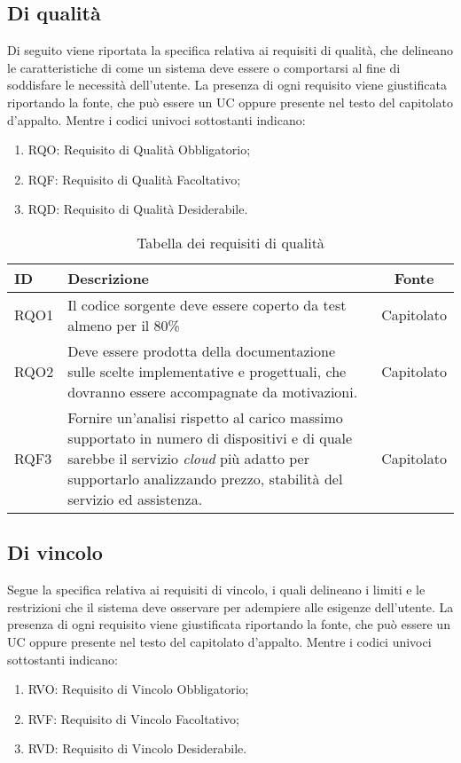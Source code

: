 \subsection{Di qualità}

Di seguito viene riportata la specifica relativa ai requisiti di qualità, che delineano le caratteristiche di come un sistema 
deve essere o comportarsi al fine di soddisfare le necessità dell'utente.
La presenza di ogni requisito viene giustificata riportando la fonte, che può essere un UC oppure presente 
nel testo del capitolato d'appalto. Mentre i codici univoci sottostanti indicano:
\begin{enumerate}
	\item RQO: Requisito di Qualità Obbligatorio;
	\item RQF: Requisito di Qualità Facoltativo;
	\item RQD: Requisito di Qualità Desiderabile.
\end{enumerate}

\begin{table}[H]
	\renewcommand{\arraystretch}{1.5}
	\centering
	\begin{tabularx}{\textwidth}{l|X|c}
		\textbf{ID} & \textbf{Descrizione}                                                                                                                  & \textbf{Fonte} \\
		\hline
		RQO1        & Il codice sorgente deve essere coperto da test almeno per il 80\%                                                                     & Capitolato     \\
		\hline
		RQO2        & Deve essere prodotta della documentazione sulle scelte implementative e progettuali, che dovranno essere accompagnate da motivazioni. & Capitolato     \\
		\hline
		RQF3        & Fornire un'analisi rispetto al carico massimo supportato in numero di dispositivi e di quale sarebbe il servizio \textit{cloud} più adatto per supportarlo analizzando prezzo, stabilità del servizio ed assistenza. & Capitolato     \\
		\hline
	\end{tabularx}
	\caption{Tabella dei requisiti di qualità}
\end{table}

\subsection{Di vincolo}

Segue la specifica relativa ai requisiti di vincolo, i quali delineano i limiti e le restrizioni che il sistema deve osservare per adempiere alle esigenze dell'utente.
La presenza di ogni requisito viene giustificata riportando la fonte, che può essere un UC oppure presente 
nel testo del capitolato d'appalto. Mentre i codici univoci sottostanti indicano:
\begin{enumerate}
	\item RVO: Requisito di Vincolo Obbligatorio;
	\item RVF: Requisito di Vincolo Facoltativo;
	\item RVD: Requisito di Vincolo Desiderabile.
\end{enumerate}

